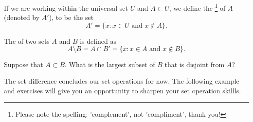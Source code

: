 If we are working within the universal set $U$ and $A \subset U$, we define the \footnote{Please note the spelling: 'complement', not 'compliment', thank you!} of $A$ (denoted by $A'$), to be the set
\[
A' = \{ x : x \in U \text{ and } x \notin A \}.
\]


\begin{defn}\label{setdifference}
The  of two sets $A$ and $B$ is defined as
\[
A \setminus B = A \cap B'  = \{ x : x \in A \text{ and } x \notin B \}.
\]
\end{defn}

\begin{exercise}{18}
Suppose that $A \subset B$. What is the largest subset of $B$ that is disjoint from $A$?
\end{exercise}

\noindent
The set difference concludes our set operations for now.  The following example and exercises will give you an opportunity to sharpen your set operation skillls. 
 
